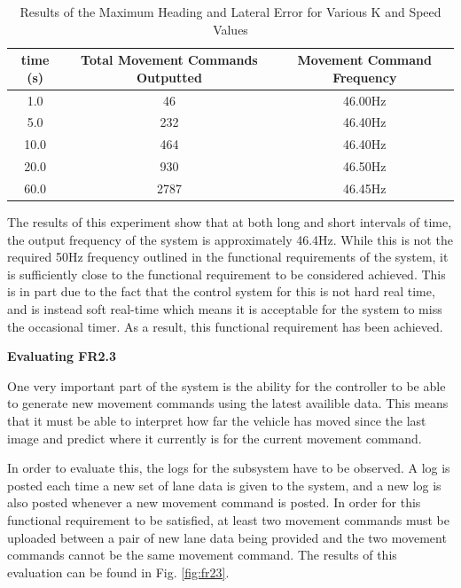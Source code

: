 \documentclass[titlepage,draft]{article}
\begin{document}
{\begin{table}
	\centering
	\begin{tabular}{| c | c | c |}
		\hline
		time (s) & Total Movement Commands Outputted & Movement Command Frequency \\ [0.5ex]
		\hline
		1.0      & 46                                & 46.00Hz                    \\
		\hline
		5.0      & 232                               & 46.40Hz                    \\
		\hline
		10.0     & 464                               & 46.40Hz                    \\
		\hline
		20.0     & 930                               & 46.50Hz                    \\
		\hline
		60.0     & 2787                              & 46.45Hz                    \\
		\hline
	\end{tabular}
	\caption{Results of the Maximum Heading and Lateral Error for Various K and Speed Values}
	\label{tab:frequency}
\end{table}


The results of this experiment show that at both long and short intervals of time, the output frequency of the system is approximately 46.4Hz. While this is not the required 50Hz frequency outlined in the functional requirements of the system, it is sufficiently close to the functional requirement to be considered achieved. This is in part due to the fact that the control system for this is not hard real time, and is instead soft real-time which means it is acceptable for the system to miss the occasional timer. As a result, this functional requirement has been achieved.

\textbf{Evaluating FR2.3}

One very important part of the system is the ability for the controller to be able to generate new movement commands using the latest availible data. This means that it must be able to interpret how far the vehicle has moved since the last image and predict where it currently is for the current movement command.

In order to evaluate this, the logs for the subsystem have to be observed. A log is posted each time a new set of lane data is given to the system, and a new log is also posted whenever a new movement command is posted. In order for this functional requirement to be satisfied, at least two movement commands must be uploaded between a pair of new lane data being provided and the two movement commands cannot be the same movement command. The results of this evaluation can be found in Fig. \ref{fig:fr23}.

}
\end{document}
